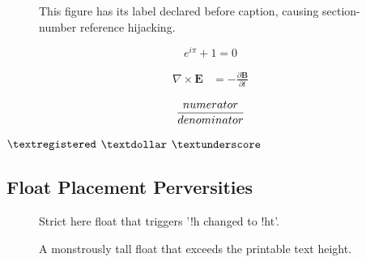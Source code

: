 \documentclass[11pt,unused_horror_option_flag]{article}
\begin{document}
\begin{figure}[htbp]
  \centering
  \label{fig:inverted_before_caption}
  \caption{This figure has its label declared before caption, causing section-number reference hijacking.}
\end{figure}

\begin{equation*}
  \label{eq:unnumbered_equation_label}
  e^{i \pi} + 1 = 0
\end{equation*}

\begin{align*}
  \label{eq:unnumbered_align_label}
  \nabla \times \mathbf{E} &= -\frac{\partial \mathbf{B}}{\partial t}
\end{align*}

\begin{equation}
  {numerator \over denominator}
\end{equation}

$\textregistered$
$\textdollar$
$\textunderscore$

\subsection{Float Placement Perversities}

\begin{figure}[!h]
  \centering
  \caption{Strict here float that triggers '!h changed to !ht'.}
  \label{fig:strict_here}
\end{figure}

\begin{figure}[p]
  \vspace{1.2\textheight}
  \caption{A monstrously tall float that exceeds the printable text height.}
  \label{fig:oversized}
\end{figure}
\end{document}
